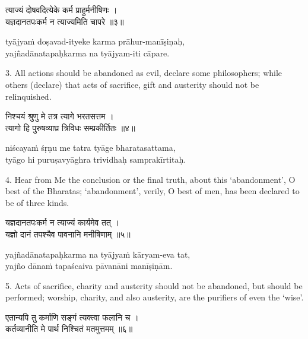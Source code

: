 \begin{gitaverse}
त्याज्यं दोषवदित्येके कर्म प्राहुर्मनीषिणः । \\
यज्ञदानतपःकर्म न त्याज्यमिति चापरे ॥३॥
\end{gitaverse}

\begin{transliteration}
tyājyaṁ doṣavad-ityeke karma prāhur-manīṣiṇaḥ, \\
yajñadānatapaḥkarma na tyājyam-iti cāpare.
\end{transliteration}

3. All actions should be abandoned as evil, declare some philosophers; while
others (declare) that acts of sacrifice, gift and austerity should not be
relinquished.

\begin{gitaverse}
निश्चयं श्रुणु मे तत्र त्यागे भरतसत्तम । \\
त्यागो हि पुरुषव्याघ्र त्रिविधः सम्प्रकीर्तितः ॥४॥
\end{gitaverse}

\begin{transliteration}
niścayaṁ śṛṇu me tatra tyāge bharatasattama, \\
tyāgo hi puruṣavyāghra trividhaḥ samprakīrtitaḥ.
\end{transliteration}

4. Hear from Me the conclusion or the final truth, about this `abandonment', O
best of the Bharatas; `abandonment', verily, O best of men, has been declared
to be of three kinds.

\begin{gitaverse}
यज्ञदानतपःकर्म न त्याज्यं कार्यमेव तत् । \\
यज्ञो दानं तपश्चैव पावनानि मनीषिणाम् ॥५॥
\end{gitaverse}

\begin{transliteration}
yajñadānatapaḥkarma na tyājyaṁ kāryam-eva tat, \\
yajño dānaṁ tapaścaiva pāvanāni manīṣiṇām.
\end{transliteration}

5. Acts of sacrifice, charity and austerity should not be abandoned, but should
be performed; worship, charity, and also austerity, are the purifiers of even
the `wise'.

\begin{gitaverse}
एतान्यपि तु कर्माणि सङ्गं त्यक्त्वा फलानि च । \\
कर्तव्यानीति मे पार्थ निश्चितं मतमुत्तमम् ॥६॥
\end{gitaverse}

